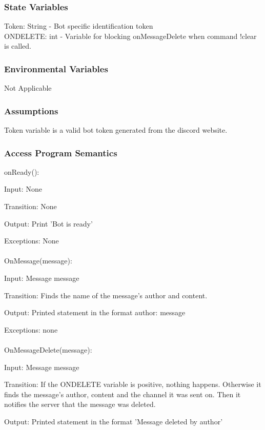 \documentclass[12,english]{article}
\begin{document}
		\subsubsection{State Variables}
			Token: String - Bot specific identification token\\
		ONDELETE: int - Variable for blocking onMessageDelete when command !clear is called.\\

		
		\subsubsection{Environmental Variables}
		Not Applicable
		
		\subsubsection{Assumptions}
		Token variable is a valid bot token generated from the discord website.
		
		\subsubsection{Access Program Semantics}
		
		
		onReady():
		
		Input: None
		
		Transition: None
		
		Output: Print 'Bot is ready'
		
		Exceptions: None\\
		\\
		
		OnMessage(message):
		
		Input: Message message
		
		Transition: Finds the name of the message's author and content.
		
		Output: Printed statement in the format author: message
		
		Exceptions: none\\ 
		\\
		OnMessageDelete(message):
		
		Input: Message message
		
		Transition: If the ONDELETE variable is positive, nothing happens. Otherwise it finds the message's author, content and the channel it was sent on. Then it notifies the server that the message was deleted.
		
		Output: Printed statement in the format 'Message deleted by {author}'
		
\end{document}
